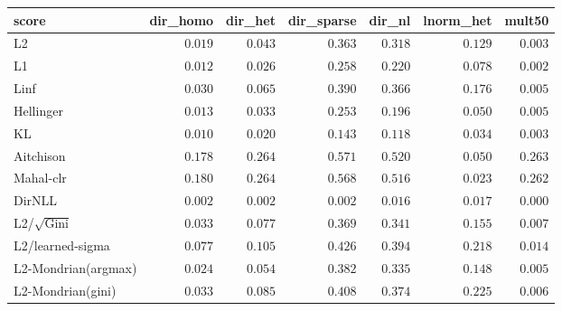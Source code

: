 \begin{tabular}{lrrrrrr}
\toprule
score & dir\_homo & dir\_het & dir\_sparse & dir\_nl & lnorm\_het & mult50 \\
\midrule
L2 & $0.019$ & $0.043$ & $0.363$ & $0.318$ & $0.129$ & $0.003$ \\
L1 & $0.012$ & $0.026$ & $0.258$ & $0.220$ & $0.078$ & $0.002$ \\
Linf & $0.030$ & $0.065$ & $0.390$ & $0.366$ & $0.176$ & $0.005$ \\
Hellinger & $0.013$ & $0.033$ & $0.253$ & $0.196$ & $0.050$ & $0.005$ \\
KL & $0.010$ & $0.020$ & $0.143$ & $0.118$ & $0.034$ & $0.003$ \\
Aitchison & $0.178$ & $0.264$ & $0.571$ & $0.520$ & $0.050$ & $0.263$ \\
Mahal-clr & $0.180$ & $0.264$ & $0.568$ & $0.516$ & $0.023$ & $0.262$ \\
DirNLL & $\mathbf{0.002}$ & $\mathbf{0.002}$ & $\mathbf{0.002}$ & $\mathbf{0.016}$ & $\mathbf{0.017}$ & $\mathbf{0.000}$ \\
L2/$\sqrt{\mathrm{Gini}}$ & $0.033$ & $0.077$ & $0.369$ & $0.341$ & $0.155$ & $0.007$ \\
L2/learned-sigma & $0.077$ & $0.105$ & $0.426$ & $0.394$ & $0.218$ & $0.014$ \\
L2-Mondrian(argmax) & $0.024$ & $0.054$ & $0.382$ & $0.335$ & $0.148$ & $0.005$ \\
L2-Mondrian(gini) & $0.033$ & $0.085$ & $0.408$ & $0.374$ & $0.225$ & $0.006$ \\
\bottomrule
\end{tabular}
